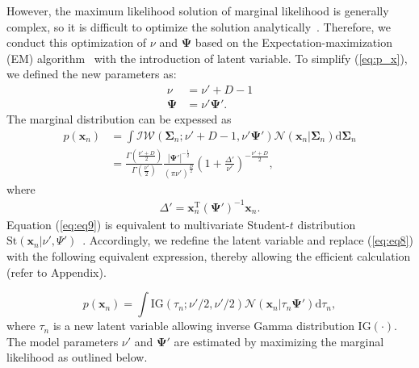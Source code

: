 \documentclass[journal]{IEEEtran}
\begin{document}
However, the maximum likelihood solution of marginal likelihood is generally complex, so it is difficult to optimize the solution analytically~\cite{t2006}.
Therefore, we conduct this optimization of $\nu$ and $\mathbf{\Psi}$ based on the Expectation-maximization (EM) algorithm~\cite{Models1998} with the introduction of latent variable.
To simplify (\ref{eq:p_x}), we defined the new parameters as:
%
\begin{align}
	\label{eq:eq6}
	\nu&= \nu' + D - 1 \\
	\label{eq:eq7}
	\mathbf{\Psi}&= \nu' \mathbf{\Psi}'.
\end{align}
The marginal distribution can be expessed as
\begin{align}%
\label{eq:eq8}
p(\mathbf{x}_n) &=\int \mathcal{IW}(\mathbf{\Sigma}_n; \nu'+D-1, \nu' \mathbf{\Psi}') \mathcal{N}(\mathbf{x}_n|\mathbf{\Sigma}_n) \mathrm{d} {\mathbf{\Sigma}_n} \\
\label{eq:eq9}
&=\frac{\Gamma(\frac{\nu'+D}{2})}{\Gamma(\frac{\nu'}{2})} \frac{|{\mathbf{\Psi}'}|^{-\frac{1}{2}}}{\left(\pi \nu' \right)^{\frac{D}{2}}} \left(1+\frac{\Delta '}{\nu '} \right)^{-\frac{\nu'+D}{2}},
\end{align}
where
\begin{align}
	\Delta ' = \mathbf{x}_n^\mathrm{T} ({\mathbf{\Psi} '})^{-1} \mathbf{x}_n.
\end{align}
Equation (\ref{eq:eq9}) is equivalent to multivariate Student-$t$ distribution $\mathrm{St}(\mathbf{x}_n|\nu', \Psi')$~\cite{t2006}. %
Accordingly, we redefine the latent variable and replace (\ref{eq:eq8}) with the following equivalent expression, thereby allowing the efficient calculation (refer to Appendix).

\begin{equation}%
\label{eq:eq11}
		p(\mathbf{x}_n) = \int \mathrm{IG}(\tau_n;\nu'/2,\nu'/2) \mathcal{N}(\mathbf{x}_n|\tau_n \mathbf{\Psi}') \mathrm{d}{\tau_n},
\end{equation}
where $\tau_n$ is a new latent variable allowing inverse Gamma distribution $\mathrm{IG(\cdot)}$.
The model parameters $\nu'$ and $\mathbf{\Psi}'$ are estimated by maximizing the marginal likelihood as outlined below.
\end{document}
